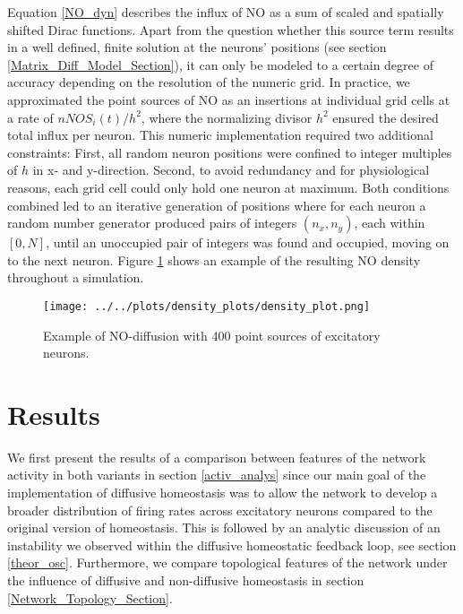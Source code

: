 \documentclass[10pt,a4paper]{article}
\begin{document}
Equation \eqref{NO_dyn} describes the influx of NO as a sum of scaled and spatially shifted Dirac functions. Apart from the question whether this source term results in a well defined, finite solution at the neurons' positions (see section \ref{Matrix_Diff_Model_Section}), it can only be modeled to a certain degree of accuracy depending on the resolution of the numeric grid. In practice, we approximated the point sources of NO as an insertions at individual grid cells at a rate of $nNOS_i(t) / h^2$, where the normalizing divisor $h^2$ ensured the desired total influx per neuron. This numeric implementation required two additional constraints: First, all random neuron positions were confined to integer multiples of $h$ in x- and y-direction. Second, to avoid redundancy and for physiological reasons, each grid cell could only hold one neuron at maximum. Both conditions combined led to an iterative generation of positions where for each neuron a random number generator produced pairs of integers $(n_x,n_y)$, each within $[0,N]$, until an unoccupied pair of integers was found and occupied, moving on to the next neuron. Figure \ref{diff_test_plot} shows an example of the resulting NO density throughout a simulation. 
\begin{figure}[h!]
\begin{center}
\texttt{[image: ../../plots/density\_plots/density\_plot.png]}
\end{center}
\caption{Example of NO-diffusion with 400 point sources of excitatory neurons.}
\label{diff_test_plot}
\end{figure}

\newpage
\section{Results} \label{results}
We first present the results of a comparison between features of the network activity in both variants in section \ref{activ_analys} since our main goal of the implementation of diffusive homeostasis was to allow the network to develop a broader distribution of firing rates across excitatory neurons compared to the original version of homeostasis. This is followed by an analytic discussion of an instability we observed within the diffusive homeostatic feedback loop, see section \ref{theor_osc}. Furthermore, we compare topological features of the network under the influence of diffusive and non-diffusive homeostasis in section \ref{Network_Topology_Section}. 
\end{document}
